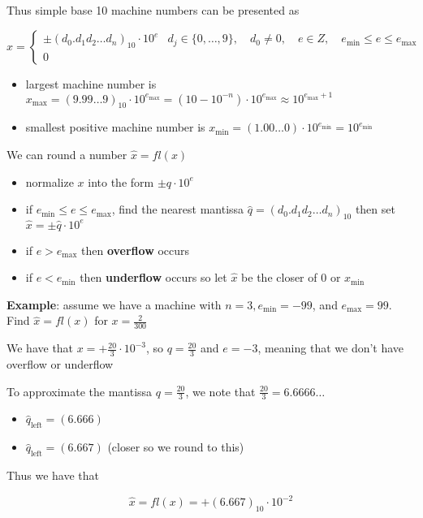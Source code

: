 \documentclass{article}
\begin{document}
Thus simple base 10 machine numbers can be presented as

\[\hat{x} = \begin{cases} \pm (d_0. d_1 d_2 \ldots d_n)_{10} \cdot 10^e & d_j \in \{0, \ldots, 9\},\quad d_0 \neq 0, \quad e \in Z, \quad e_{\min} \leq e \leq e_{\max} \\ 0 \end{cases}\]
\begin{itemize}
  \item largest machine number is $x_{\max} = (9.99 \ldots 9)_{10} \cdot 10^{e_{\max}} = (10 - 10^{-n}) \cdot 10^{e_{\max}} \approx 10^{e_{\max} + 1}$
  \item smallest positive machine number is $x_{\min} = (1.00 \ldots 0) \cdot 10^{e_{\min}} = 10^{e_{\min}}$
\end{itemize}

We can round a number $\hat{x} = fl(x)$
\begin{itemize}
  \item normalize $x$ into the form $\pm q \cdot 10^e$
  \item if $e_{\min} \leq e \leq e_{\max}$, find the nearest mantissa $\hat{q} = (d_0.d_1 d_2 \ldots d_n)_{10}$ then set $\hat{x} = \pm \hat{q} \cdot 10^e$
  \item if $e > e_{\max}$ then \textbf{overflow} occurs
  \item if $e < e_{\min}$ then \textbf{underflow} occurs so let $\hat{x}$ be the closer of $0$ or $x_{\min}$
\end{itemize}

\textbf{Example}: assume we have a machine with $n = 3, e_{\min} = -99$, and $e_{\max} = 99$. Find $\hat{x} = fl(x)$ for $x = \frac{2}{300}$

We have that $x = + \frac{20}{3} \cdot 10^{-3}$, so $q = \frac{20}{3}$ and $e = -3$, meaning that we don't have overflow or underflow

To approximate the mantissa $q = \frac{20}{3}$, we note that $\frac{20}{3} = 6.6666 \ldots$
\begin{itemize}
  \item $\hat{q}_\text{left} = (6.666)$
  \item $\hat{q}_\text{left} = (6.667)$ (closer so we round to this)
\end{itemize}

Thus we have that

\[\hat{x} = fl(x) = + (6.667)_{10} \cdot 10^{-2}\]

\bigskip
\end{document}
